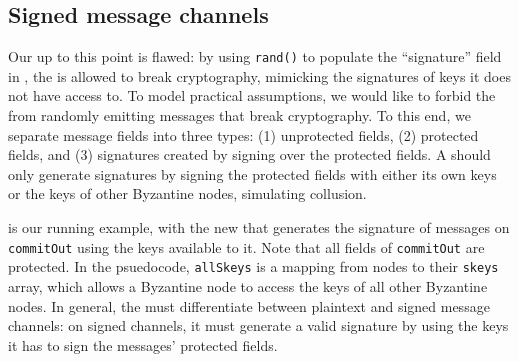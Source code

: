 \subsection{Signed message channels}
\label{sec:signed-channels-formalism}

Our \randomHarness{} up to this point is flawed: by using \texttt{rand()} to populate the ``signature'' field in  , the \randomSimulator{} is allowed to break cryptography, mimicking the signatures of keys it does not have access to.
To model practical assumptions, we would like to forbid the \randomSimulator{} from randomly emitting messages that break cryptography.
To this end, we separate message fields into three types:
(1) unprotected fields,
(2) protected fields, and
(3) signatures created by signing over the protected fields.
A \randomSimulator{} should only generate signatures by signing the protected fields with either its own keys or the keys of other Byzantine nodes, simulating collusion.


 is our running example, with the new \randomHarness{} that generates the signature of messages on \texttt{commitOut} using the keys available to it.
Note that all fields of \texttt{commitOut} are protected.
In the psuedocode, \texttt{allSkeys} is a mapping from nodes to their \texttt{skeys} array, which allows a Byzantine node to access the keys of all other Byzantine nodes.
In general, the \randomHarness{} must differentiate between plaintext and signed message channels: on signed channels, it must generate a valid signature by using the keys it has to sign the messages' protected fields.

